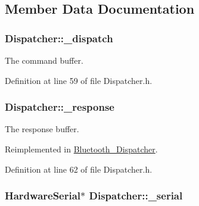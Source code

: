 \subsection{\-Member \-Data \-Documentation}
\hypertarget{class_dispatcher_aaedb32e8b575e70f297933122fdf7fe0}{
\subsubsection[{\-\_\-dispatch}]{ {\bf \-Dispatcher\-::\-\_\-dispatch}}}\label{class_dispatcher_aaedb32e8b575e70f297933122fdf7fe0}


\-The command buffer. 



\-Definition at line 59 of file \-Dispatcher.\-h.

\hypertarget{class_dispatcher_a0e3c3d9054c4d8180aa56655bb6206a2}{
\subsubsection[{\-\_\-response}]{ {\bf \-Dispatcher\-::\-\_\-response}}}\label{class_dispatcher_a0e3c3d9054c4d8180aa56655bb6206a2}


\-The response buffer. 



\-Reimplemented in \hyperlink{class_bluetooth___dispatcher_a37efed7ffe1b2bcc846ade2406174796}{\-Bluetooth\-\_\-\-Dispatcher}.



\-Definition at line 62 of file \-Dispatcher.\-h.

\hypertarget{class_dispatcher_ab761cd7589c1d5fda8ff1b5ec4ce679f}{
\subsubsection[{\-\_\-serial}]{\setlength{\rightskip}{0pt plus 5cm}\-Hardware\-Serial$\ast$ {\bf \-Dispatcher\-::\-\_\-serial}}}\label{class_dispatcher_ab761cd7589c1d5fda8ff1b5ec4ce679f}


